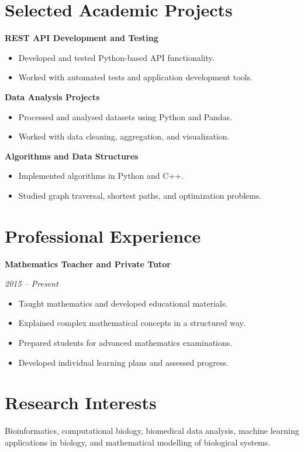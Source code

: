 \documentclass[9pt,a4paper]{article}
\begin{document}
\section*{Selected Academic Projects}

\textbf{REST API Development and Testing}

\begin{itemize}
    \item Developed and tested Python-based API functionality.
    \item Worked with automated tests and application development tools.
\end{itemize}

\textbf{Data Analysis Projects}

\begin{itemize}
    \item Processed and analysed datasets using Python and Pandas.
    \item Worked with data cleaning, aggregation, and visualization.
\end{itemize}

\textbf{Algorithms and Data Structures}

\begin{itemize}
    \item Implemented algorithms in Python and C++.
    \item Studied graph traversal, shortest paths, and optimization problems.
\end{itemize}

\section*{Professional Experience}

\textbf{Mathematics Teacher and Private Tutor}

\textit{2015 -- Present}

\begin{itemize}
    \item Taught mathematics and developed educational materials.
    \item Explained complex mathematical concepts in a structured way.
    \item Prepared students for advanced mathematics examinations.
    \item Developed individual learning plans and assessed progress.
\end{itemize}

\section*{Research Interests}

Bioinformatics, computational biology, biomedical data analysis,
machine learning applications in biology, and mathematical modelling
of biological systems.
\end{document}
